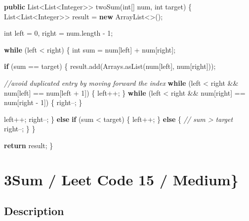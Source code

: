 \documentclass[]{book}
\newenvironment{Shaded}{\begin{snugshade}}{\end{snugshade}}
\newcommand{\BuiltInTok}[1]{#1}
\newcommand{\CommentTok}[1]{\textcolor[rgb]{0.56,0.35,0.01}{\textit{#1}}}
\newcommand{\DataTypeTok}[1]{\textcolor[rgb]{0.13,0.29,0.53}{#1}}
\newcommand{\DecValTok}[1]{\textcolor[rgb]{0.00,0.00,0.81}{#1}}
\newcommand{\FunctionTok}[1]{\textcolor[rgb]{0.00,0.00,0.00}{#1}}
\newcommand{\KeywordTok}[1]{\textcolor[rgb]{0.13,0.29,0.53}{\textbf{#1}}}
\newcommand{\NormalTok}[1]{#1}
\begin{document}
\begin{Shaded}
\begin{Highlighting}[]
\KeywordTok{public} \BuiltInTok{List}\NormalTok{<}\BuiltInTok{List}\NormalTok{<}\BuiltInTok{Integer}\NormalTok{>> }\FunctionTok{twoSum}\NormalTok{(}\DataTypeTok{int}\NormalTok{[] num, }\DataTypeTok{int}\NormalTok{ target) \{}
    \BuiltInTok{List}\NormalTok{<}\BuiltInTok{List}\NormalTok{<}\BuiltInTok{Integer}\NormalTok{>> result = }\KeywordTok{new} \BuiltInTok{ArrayList}\NormalTok{<>();}

    \DataTypeTok{int}\NormalTok{ left = }\DecValTok{0}\NormalTok{, right = num.}\FunctionTok{length}\NormalTok{ - }\DecValTok{1}\NormalTok{;}

    \KeywordTok{while}\NormalTok{ (left < right) \{}
        \DataTypeTok{int}\NormalTok{ sum = num[left] + num[right];}

        \KeywordTok{if}\NormalTok{ (sum == target) \{}
\NormalTok{            result.}\FunctionTok{add}\NormalTok{(}\BuiltInTok{Arrays}\NormalTok{.}\FunctionTok{asList}\NormalTok{(num[left], num[right]));}

            \CommentTok{//avoid duplicated entry by moving forward the index}
            \KeywordTok{while}\NormalTok{ (left < right && num[left] == num[left + }\DecValTok{1}\NormalTok{]) \{}
\NormalTok{                left++;}
\NormalTok{            \}}
            \KeywordTok{while}\NormalTok{ (left < right && num[right] == num[right - }\DecValTok{1}\NormalTok{]) \{}
\NormalTok{                right--;}
\NormalTok{            \}}

\NormalTok{            left++;}
\NormalTok{            right--;}
\NormalTok{        \} }\KeywordTok{else} \KeywordTok{if}\NormalTok{ (sum < target) \{}
\NormalTok{            left++;}
\NormalTok{        \} }\KeywordTok{else}\NormalTok{ \{}
            \CommentTok{// sum > target}
\NormalTok{            right--;}
\NormalTok{        \}}
\NormalTok{    \}}

    \KeywordTok{return}\NormalTok{ result;}
\NormalTok{\}}
\end{Highlighting}
\end{Shaded}

\hypertarget{sum-leet-code-15-medium}{%
\section{3Sum / Leet Code 15 / Medium\}}\label{sum-leet-code-15-medium}}

\hypertarget{description-4}{%
\subsection{Description}\label{description-4}}
\end{document}
